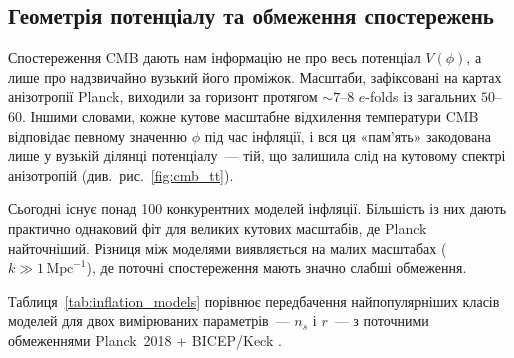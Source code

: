 \documentclass[12pt, a4paper]{article}
\begin{document}
\subsection{Геометрія потенціалу та обмеження спостережень}

Спостереження CMB дають нам інформацію не про весь потенціал
$V(\phi)$, а лише про надзвичайно вузький його проміжок. Масштаби,
зафіксовані на картах анізотропії Planck, виходили за горизонт
протягом $\sim\!7$--$8$ $e$-folds із загальних $50$--$60$. Іншими
словами, кожне кутове масштабне відхилення температури CMB
відповідає певному значенню $\phi$ під час інфляції, і вся ця
«пам'ять» закодована лише у вузькій ділянці потенціалу~---
тій, що залишила слід на кутовому спектрі анізотропій
(див.\ рис.~\ref{fig:cmb_tt}).


Сьогодні існує понад 100 конкурентних моделей інфляції.
Більшість із них дають практично однаковий фіт для великих
кутових масштабів, де Planck найточніший. Різниця між
моделями виявляється на малих масштабах
($k \gg 1\,\mathrm{Mpc}^{-1}$), де поточні спостереження
мають значно слабші обмеження.

Таблиця~\ref{tab:inflation_models} порівнює передбачення
найпопулярніших класів моделей для двох вимірюваних
параметрів~--- $n_s$ і $r$~--- з поточними обмеженнями
Planck~2018 \cite{planck_2018} + BICEP/Keck \cite{bicep_keck_2021}.
\end{document}
